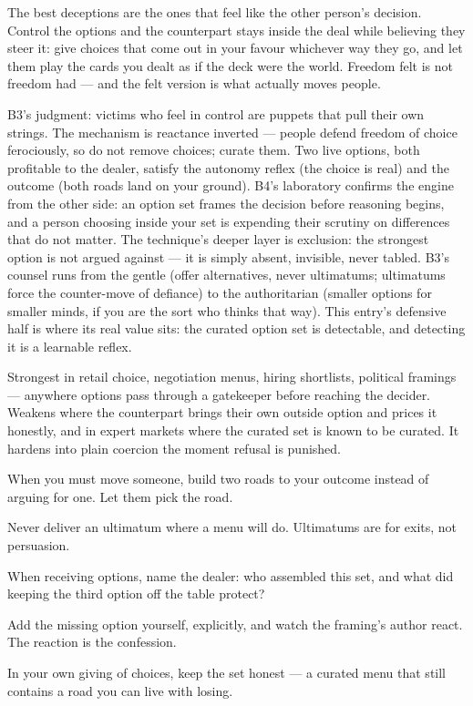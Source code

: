 \begin{core}
The best deceptions are the ones that feel like the other person's decision. Control the options and the counterpart stays inside the deal while believing they steer it: give choices that come out in your favour whichever way they go, and let them play the cards you dealt as if the deck were the world. Freedom felt is not freedom had --- and the felt version is what actually moves people.
\end{core}
\begin{mechanism}
B3's judgment: victims who feel in control are puppets that pull their own strings. The mechanism is reactance inverted --- people defend freedom of choice ferociously, so do not remove choices; curate them. Two live options, both profitable to the dealer, satisfy the autonomy reflex (the choice is real) and the outcome (both roads land on your ground). B4's laboratory confirms the engine from the other side: an option set frames the decision before reasoning begins, and a person choosing inside your set is expending their scrutiny on differences that do not matter. The technique's deeper layer is exclusion: the strongest option is not argued against --- it is simply absent, invisible, never tabled. B3's counsel runs from the gentle (offer alternatives, never ultimatums; ultimatums force the counter-move of defiance) to the authoritarian (smaller options for smaller minds, if you are the sort who thinks that way). This entry's defensive half is where its real value sits: the curated option set is detectable, and detecting it is a learnable reflex.
\end{mechanism}
\begin{conditions}
Strongest in retail choice, negotiation menus, hiring shortlists, political framings --- anywhere options pass through a gatekeeper before reaching the decider. Weakens where the counterpart brings their own outside option and prices it honestly, and in expert markets where the curated set is known to be curated. It hardens into plain coercion the moment refusal is punished.
\end{conditions}
\begin{application}
  \item When you must move someone, build two roads to your outcome instead of arguing for one. Let them pick the road.
  \item Never deliver an ultimatum where a menu will do. Ultimatums are for exits, not persuasion.
  \item When receiving options, name the dealer: who assembled this set, and what did keeping the third option off the table protect?
  \item Add the missing option yourself, explicitly, and watch the framing's author react. The reaction is the confession.
  \item In your own giving of choices, keep the set honest --- a curated menu that still contains a road you can live with losing.
\end{application}
